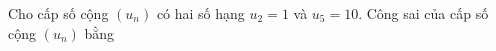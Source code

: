 \begin{ex}
Cho cấp số cộng $(u_n)$ có hai số hạng $u_2=1$ và $u_5=10$. Công sai của cấp số cộng $(u_n)$ bằng
\end{ex}
